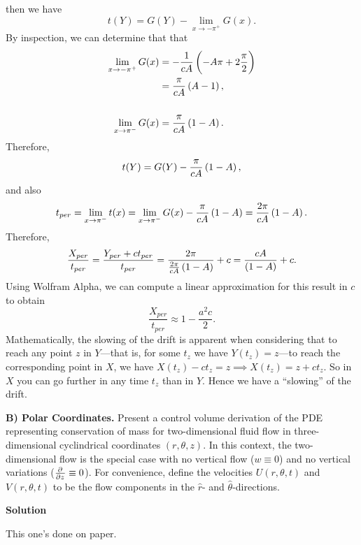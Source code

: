 \documentclass{article}
\begin{document}
%
then we have
%
\begin{equation*}
    t(Y) = G(Y) - \lim_{x \to -\pi^+} G(x)
    .
\end{equation*}
%
By inspection, we can determine that that
%
\begin{align*}
    \lim_{x \to - \pi^+} G(x)
        &= - \frac{1}{c A} \del{- A \pi + 2 \frac{\pi}{2}} \\
        &= \frac{\pi}{c A} \del{A - 1}, \\ \\
    \lim_{x \to \pi^-} G(x)
        &= \frac{\pi}{c A} \del{1 - A}.
\end{align*}
%
Therefore,
%
\begin{equation*}
    t(Y) = G(Y) - \frac{\pi}{c A} \del{1 - A}
    ,
\end{equation*}
%
and also
%
\begin{equation*}
    t_{per}
        = \lim_{x \to \pi^-} t(x)
        = \lim_{x \to \pi^-} G(x) - \frac{\pi}{c A} \del{1 - A}
        = \frac{2 \pi}{c A} \del{1 - A}
    .
\end{equation*}
%
Therefore,
%
\begin{equation*}
    \frac{X_{per}}{t_{per}}
        = \frac{Y_{per} + c t_{per}}{t_{per}}
        = \frac{2 \pi}{\frac{2 \pi}{c A} \del{1 - A}} + c
        = \frac{c A}{\del{1 - A}} + c
    .
\end{equation*}
%
Using Wolfram Alpha, we can compute a linear approximation for this
result in $c$ to obtain
%
\begin{equation*}
    \frac{X_{per}}{t_{per}} \approx 1 - \frac{a^2 c}{2}
    .
\end{equation*}
%
Mathematically, the slowing of the drift is apparent when considering
that to reach any point $z$ in $Y$---that is, for some $t_z$ we have
$Y(t_z) = z$---to reach the corresponding point in $X$, we have $X(t_z)
- c t_z = z \implies X(t_z) = z + c t_z$. So in $X$ you can go further
in any time $t_z$ than in $Y$. Hence we have a ``slowing'' of the drift.


\newpage

\textbf{B) Polar Coordinates.} Present a control volume derivation of
the PDE representing conservation of mass for two-dimensional fluid flow
in three-dimensional cyclindrical coordinates $(r, \theta, z)$. In this
context, the two-dimensional flow is the special case with no vertical
flow ($w \equiv 0$) and no vertical variations ($\pd{}{z} \equiv 0$).
For convenience, define the velocities $U(r, \theta, t)$ and $V(r,
\theta, t)$ to be the flow components in the $\hat{r}$- and
$\hat{\theta}$-directions.

\textbf{Solution}

This one's done on paper.
\end{document}
